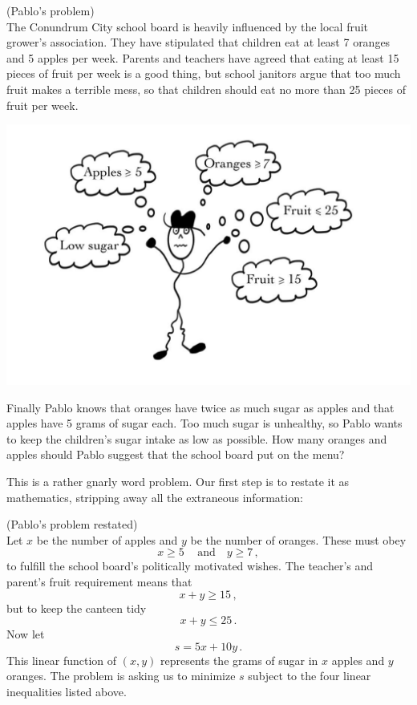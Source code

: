 \begin{example}(Pablo's problem)\\
The Conundrum City school board is heavily influenced by the local fruit grower's association. They have stipulated
that children eat at least 7 oranges and 5 apples per week. Parents and teachers have agreed that eating at least 15 pieces of fruit per
week is a good thing, but school janitors argue that too much fruit makes a terrible mess, so that children should eat no more than
25 pieces of fruit per week. 
\begin{center}
\includegraphics[scale=.3]{simplex/Pablo.jpg}
\end{center}
\noindent
Finally Pablo knows that oranges have twice as much sugar as apples
and that apples have 5 grams of sugar each. Too much sugar is unhealthy, so Pablo wants to keep the children's sugar intake as low 
as possible. How many oranges and apples should Pablo suggest that the school board put on the menu?
\end{example}

This is a rather gnarly word problem. Our first step is to restate it as mathematics, stripping away all the extraneous information:

\begin{example}(Pablo's problem restated)\\
Let $x$ be the number of apples and $y$ be the number of oranges. These must obey
\[
x\geq5\, \quad\mbox{and}\quad y\geq7\, ,
\]
to fulfill the school board's politically motivated wishes. The teacher's and parent's fruit requirement means that
\[
x+y\geq 15\, ,
\]
but to keep the canteen tidy
\[
x+y\leq 25\, .
\]
Now let 
\[s=5x+10y\, .\]
This linear function of $(x,y)$ represents the grams of sugar in $x$ apples and $y$ oranges.
The problem is asking us to minimize $s$ subject to the four linear inequalities listed above.
\end{example}

